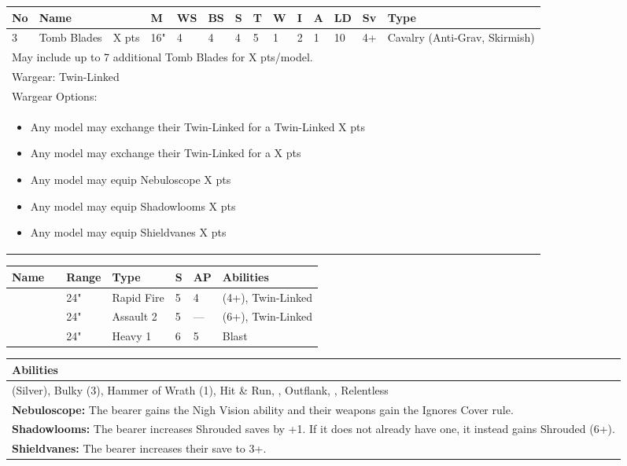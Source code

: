 \noindent
\begin{tabular}{||m{10pt} m{95pt} m{30pt} m{11pt} m{11pt} m{11pt} m{11pt} m{11pt} m{11pt} m{11pt} m{11pt} m{11pt} m{11pt} m{125pt}||}
	\hline
	No & Name & & M & WS & BS & S & T & W & I & A & LD & Sv & Type \\
	\hline
	3 & Tomb Blades & X pts & 16" & 4 & 4 & 4 & 5 & 1 & 2 & 1 & 10 & 4+ & Cavalry (Anti-Grav, Skirmish)\\
	\hline
	\hline
	\multicolumn{14}{||Z{532 pt}||}{May include up to 7 additional Tomb Blades for X pts/model.}\\		
	\hline
	\hline
	\multicolumn{14}{||Z{532 pt}||}{Wargear: Twin-Linked \quickref{Gauss Blaster}}\\
	\multicolumn{14}{||Z{532 pt}||}{Wargear Options:} \\	\multicolumn{14}{||Z{532 pt}||}{\begin{itemize}
			\item Any model may exchange their Twin-Linked \quickref{Gauss Blaster} for a Twin-Linked \quickref{Tesla Carbine} \hrulefill X pts
			\item Any model may exchange their Twin-Linked \quickref{Gauss Blaster} for a \quickref{Particle Beamer} \hrulefill X pts
			\item Any model may equip Nebuloscope \hrulefill X pts
			\item Any model may equip Shadowlooms \hrulefill X pts
			\item Any model may equip Shieldvanes \hrulefill X pts
	\end{itemize}} \\
	\hline
\end{tabular}

\noindent
\begin{tabular}{||m{110pt} m{30pt} m{31pt} m{55pt} m{12pt} m{12pt} m{210pt}||}
	\hline
	Name & & Range & Type & S & AP & Abilities \\
	\hline
	\quickref{Gauss Blaster} & & 24" & Rapid Fire & 5 & 4 & \quickref{Gauss} (4+), Twin-Linked \\
	\quickref{Tesla Carbine} & & 24" & Assault 2 & 5 & — & \quickref{Tesla} (6+), Twin-Linked \\
	\quickref{Particle Beamer} & & 24" & Heavy 1 & 6 & 5 & Blast \\
	\hline
\end{tabular}

\noindent
\begin{tabular}{||m{532pt}||}
	\hline
	Abilities \\
	\hline
	\quickref{Awakening Protocols} (Silver), Bulky (3), Hammer of Wrath (1), Hit \& Run, \quickref{Living Metal}, Outflank, \quickref{Reanimation Protocols}, Relentless\\
	\textbf{Nebuloscope:} The bearer gains the Nigh Vision ability and their weapons gain the Ignores Cover rule.\\
	\textbf{Shadowlooms:} The bearer increases Shrouded saves by +1. If it does not already have one, it instead gains Shrouded (6+). \\
	\textbf{Shieldvanes:} The bearer increases their save to 3+.\\
	\hline
\end{tabular}